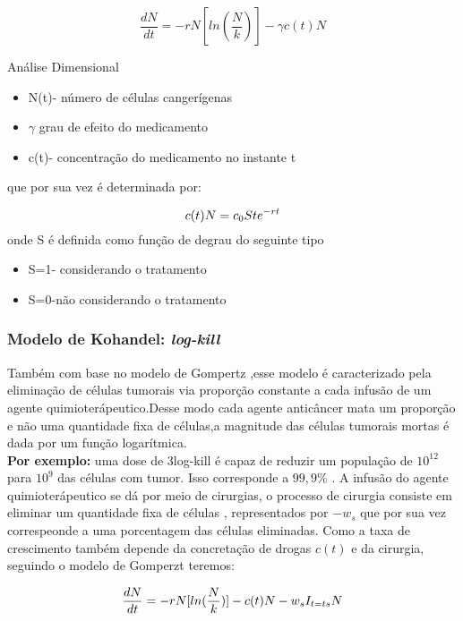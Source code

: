 \begin{equation}
  \frac{dN}{dt}= -rN[ln(\frac{N}{k})]-\gamma c(t)N
\end{equation}

Análise Dimensional

\begin{itemize}

    \item N(t)- número de células cangerígenas
    \item $\gamma$ grau de efeito do medicamento 
    \item c(t)- concentração do medicamento no instante t
\end{itemize}

que por sua vez é determinada por:

\begin{equation*}
    c(t)N=c_0Ste^{-rt}  \\
\end{equation*}
onde S é definida como  função de degrau do seguinte tipo 
\begin{itemize}

    \item S=1- considerando o tratamento
    \item S=0-não considerando o tratamento
\end{itemize}

\subsubsection{Modelo de Kohandel: \textit{log-kill}}

Também com base no modelo de Gompertz ,esse modelo é caracterizado pela eliminação de células tumorais via proporção constante a cada infusão de um agente quimioterápeutico.Desse modo cada agente anticâncer mata um proporção e não uma quantidade fixa de células,a magnitude das células tumorais mortas é dada por um função logarítmica.\\
\textbf{Por exemplo:} uma dose de 3log-kill é capaz de reduzir um população de $10^12$ para $10^9$ das células com tumor. Isso corresponde a $99,9\%$ .
A infusão do agente quimioterápeutico se dá por meio de cirurgias, o processo de cirurgia consiste em eliminar um quantidade fixa de células , representados por $-w_s$ que por sua vez correspeonde  a uma porcentagem das células eliminadas.
Como a taxa de crescimento também depende da concretação de drogas $c(t)$ e da cirurgia, seguindo o modelo de Gomperzt teremos:

 
\begin{equation}

  \frac{dN}{dt} =-rN[ln(\frac{N}{k})]- c(t)N-w_sI_{t=ts}N\\
  
\end{equation}

